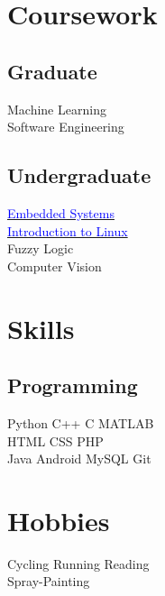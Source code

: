 \documentclass[]{deedy-resume-openfont}
\begin{document}
\begin{minipage}[t]{0.33\textwidth}

\section{Coursework}
\subsection{Graduate}
Machine Learning \\
Software Engineering \\
\sectionsep

\subsection{Undergraduate}
\href{https://s3.amazonaws.com/verify.edx.org/downloads/da8f6310cc1d4955b810a45a3f79d526/Certificate.pdf}{\textcolor{blue}{Embedded Systems}} \\
\href{https://s3.amazonaws.com/verify.edx.org/downloads/6ec0a7e04dd64df5aa47a653321fbf57/Certificate.pdf}{\textcolor{blue}{Introduction to Linux}} \\
Fuzzy Logic \\
Computer Vision \\
\sectionsep


\section{Skills}
\subsection{Programming}
Python \textbullet{}   C++ \textbullet{} C \textbullet{} MATLAB \\
HTML \textbullet{} CSS \textbullet{} PHP \\
Java \textbullet{} Android \textbullet{} MySQL \textbullet{} Git
\sectionsep


\section{Hobbies}
Cycling \textbullet{}  Running \textbullet{} Reading \\
Spray-Painting \\

%
%

\end{minipage}
\end{document}
